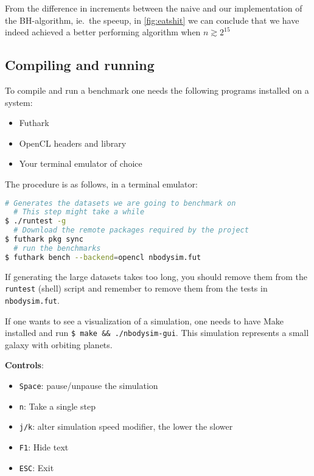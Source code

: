 From the difference in increments between the naive and our implementation of
the BH-algorithm, ie.\ the speeup, in \autoref{fig:eatshit} we can conclude that
we have indeed achieved a better performing algorithm when $n \gtrsim 2^{15}$

\subsection{Compiling and running}
To compile and run a benchmark one needs the following programs
installed on a system:

\begin{itemize}
  \item Futhark
  \item OpenCL headers and library
  \item Your terminal emulator of choice
\end{itemize}

The procedure is as follows, in a terminal emulator: \\
\begin{lstlisting}[language=bash]
  # Generates the datasets we are going to benchmark on
  # This step might take a while
$ ./runtest -g
  # Download the remote packages required by the project
$ futhark pkg sync
  # run the benchmarks
$ futhark bench --backend=opencl nbodysim.fut
\end{lstlisting}

If generating the large datasets takes too long, you should remove them from the
\texttt{runtest} (shell) script and remember to remove them from the tests in
\texttt{nbodysim.fut}.

If one wants to see a visualization of a simulation, one needs to have Make
installed and run \texttt{\$ make \&\& ./nbodysim-gui}. This simulation
represents a small galaxy with orbiting planets.

\noindent
\textbf{Controls}:
\begin{itemize}
  \item \texttt{Space}: pause/unpause the simulation
  \item \texttt{n}: Take a single step
  \item \texttt{j/k}: alter simulation speed modifier, the lower the slower
  \item \texttt{F1}: Hide text
  \item \texttt{ESC}: Exit
\end{itemize}
